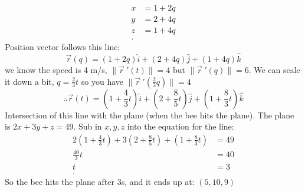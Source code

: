 \begin{itemize}
\begin{example}
\begin{align*}
		x &=  1 + 2q \\
		y &=  2+4q \\
		z &=  1+4q \\
	.\end{align*}
	Position vector follows this line:
	\begin{equation}
		\vec{r}(q) = \left( 1+2q \right) \hat{i} + \left( 2+4q \right) \hat{j} + \left( 1+4q \right) \hat{k}
	\end{equation}
	we know the speed is 4 m/s, $\lVert \vec{r}~'(t) \rVert  = 4$ but $\lVert \vec{r} ~'(q) \rVert  = 6$. We can scale it down a bit, $q = \frac{2}{3}t$ so you have $\lVert \vec{r} ~ ' \left( \frac{2}{3}q \right) \rVert = 4$ 
	\begin{equation}
		\therefore \vec{r}(t) = \left( 1+\frac{4}{3}t \right) \hat{i} + \left( 2+ \frac{8}{5}t \right) \hat{j} + \left( 1+\frac{8}{3}t \right) \hat{k}
	\end{equation}
	Intersection of this line with the plane (when the bee hits the plane). The plane is $2x+3y+z = 49$. Sub in $x,y,z$ into the equation for the line:
	\begin{align*}
		2\left( 1+\frac{4}{3}t \right) + 3\left( 2+\frac{8}{5}t \right)  + \left( 1+\frac{8}{3}t \right) &= 49 \\
		\frac{40}{3}t &=  40 \\
		t &=  3 \\
	.\end{align*}
	So the bee hits the plane after 3s, and it ends up at: $\left( 5,10,9 \right) $
\end{example}
\end{itemize}
